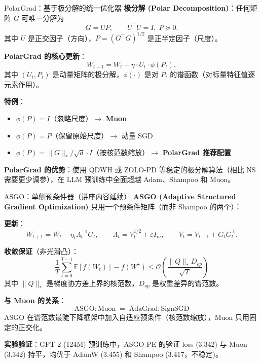 \documentclass[aspectratio=169,10pt]{ctexbeamer}
\newcommand{\E}{\mathbb{E}}
\newcommand{\eps}{\varepsilon}
\begin{document}
\begin{frame}{PolarGrad：基于极分解的统一优化器}
\textbf{极分解 (Polar Decomposition)}：任何矩阵 $G$ 可唯一分解为
\[
  G = U P,\qquad U^\top U = I,\; P \succeq 0.
\]
其中 $U$ 是正交因子（方向），$P=(G^\top G)^{1/2}$ 是正半定因子（尺度）。

\vspace{0.2cm}
\textbf{PolarGrad 的核心更新}：
\[
  W_{t+1} = W_t - \eta\cdot U_t\cdot \phi(P_t),
\]
其中 $(U_t,P_t)$ 是动量矩阵的极分解，$\phi(\cdot)$ 是对 $P_t$ 的谱函数（对标量特征值逐元素作用）。

\vspace{0.2cm}
\textbf{特例}：
\begin{itemize}
  \item $\phi(P)=I$（忽略尺度）$\to$ \textbf{Muon}
  \item $\phi(P)=P$（保留原始尺度）$\to$ 动量 SGD
  \item $\phi(P)=\|G\|_*/\sqrt{d}\cdot I$（按核范数缩放）$\to$ \textbf{PolarGrad 推荐配置}
\end{itemize}

\vspace{0.2cm}
\textbf{PolarGrad 的优势}：使用 QDWH 或 ZOLO-PD 等稳定的极分解算法（相比 NS 需要更少调参），在 LLM 预训练中全面超越 Adam、Shampoo 和 Muon。
\end{frame}

\begin{frame}{ASGO：单侧预条件器（讲座内容延续）}
\textbf{ASGO (Adaptive Structured Gradient Optimization)} 只用一个预条件矩阵（而非 Shampoo 的两个）：

\vspace{0.15cm}
\textbf{更新}：
\[
  W_{t+1} = W_t - \eta_t \Lambda_t^{-1} G_t,\qquad
  \Lambda_t = V_t^{1/2} + \eps I_m,\qquad
  V_t = V_{t-1} + G_t G_t^\top.
\]

\vspace{0.15cm}
\textbf{收敛保证}（非光滑凸）：
\[
  \frac{1}{T}\sum_{t=0}^{T-1}\E[f(W_t)] - f(W^\star) \le \mathcal{O}\!\left(\frac{\|Q\|_* D_{op}}{\sqrt{T}}\right)
\]
其中 $\|Q\|_*$ 是梯度协方差上界的核范数，$D_{op}$ 是权重差异的谱范数。

\vspace{0.15cm}
\textbf{与 Muon 的关系}：
\[
  \text{ASGO} : \text{Muon} \;=\; \text{AdaGrad} : \text{SignSGD}
\]
ASGO 在谱范数最陡下降框架中加入自适应预条件（核范数缩放），Muon 只用固定的正交化。

\vspace{0.15cm}
\textbf{实验验证}：GPT-2 (124M) 预训练中，ASGO-PE 的验证 loss (3.342) 与 Muon (3.342) 持平，均优于 AdamW (3.455) 和 Shampoo (3.417，不稳定)。
\end{frame}
\end{document}
